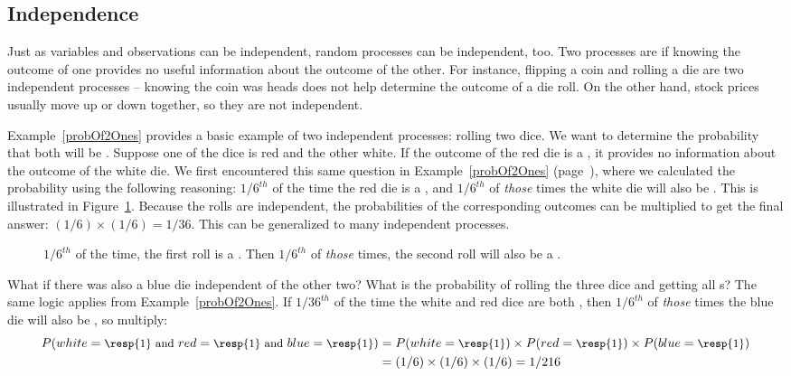 \subsection{Independence}
\label{probabilityIndependence}

Just as variables and observations can be independent, random processes can be independent, too. Two processes are  if knowing the outcome of one provides no useful information about the outcome of the other. For instance, flipping a coin and rolling a die are two independent processes -- knowing the coin was heads does not help determine the outcome of a die roll. On the other hand, stock prices usually move up or down together, so they are not independent.

Example~\ref{probOf2Ones} provides a basic example of two independent processes: rolling two dice. We want to determine the probability that both will be . Suppose one of the dice is red and the other white. If the outcome of the red die is a , it provides no information about the outcome of the white die. We first encountered this same question in Example~\ref{probOf2Ones} (page~\pageref{probOf2Ones}), where we calculated the probability using the following reasoning: $1/6^{th}$ of the time the red die is a , and $1/6^{th}$ of \emph{those} times the white die will also be . This is illustrated in Figure~\ref{indepForRollingTwo1s}. Because the rolls are independent, the probabilities of the corresponding outcomes can be multiplied to get the final answer: $(1/6)\times(1/6)=1/36$. This can be generalized to many independent processes.

\begin{figure}[hht]
\centering
{}
\caption{$1/6^{th}$ of the time, the first roll is a . Then $1/6^{th}$ of \emph{those} times, the second roll will also be a .}
\label{indepForRollingTwo1s}
\end{figure}

\D{\newpage}

\begin{examplewrap}
\begin{nexample}{What if there was also a blue die independent of the other two? What is the probability of rolling the three dice and getting all s?}\label{threeDice}
The same logic applies from Example~\ref{probOf2Ones}. If $1/36^{th}$ of the time the white and red dice are both , then $1/6^{th}$ of \emph{those} times the blue die will also be , so multiply:
{\begin{align*}
P(white=\text{\small\resp{1} and } red=\text{\small\resp{1} and } blue=\text{\small\resp{1}})
	&= P(white=\text{\small\resp{1}})\times P(red=\text{\small\resp{1}})\times P(blue=\text{\small\resp{1}}) \\
	&= (1/6)\times (1/6)\times (1/6)
	= 1/216
\end{align*}} \vspace{-7mm}
\end{nexample}
\end{examplewrap}

